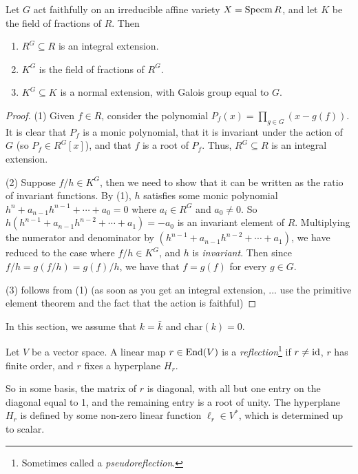 \begin{proposition}
 Let $G$ act faithfully on an irreducible affine variety $X=\operatorname{Specm} R$, and let $K$ be the field of fractions of $R$. Then
 \begin{enumerate}
  \item $R^G\subseteq R$ is an integral extension.
  \item $K^G$ is the field of fractions of $R^G$.
  \item $K^G\subseteq K$ is a normal extension, with Galois group equal to $G$.
 \end{enumerate}
\end{proposition}
\begin{proof}
 (1) Given $f\in R$, consider the polynomial $P_f(x)=\prod_{g\in G}(x-g(f))$. It is clear that $P_f$ is a monic polynomial, that it is invariant under the action of $G$ (so $P_f\in R^G[x]$), and that $f$ is a root of $P_f$. Thus, $R^G\subseteq R$ is an integral extension.
 
 (2) Suppose $f/h\in K^G$, then we need to show that it can be written as the ratio of invariant functions. By (1), $h$ satisfies some monic polynomial $h^n+a_{n-1}h^{n-1}+\cdots +a_0=0$ where $a_i\in R^G$ and $a_0\neq 0$. So $h(h^{n-1}+a_{n-1}h^{n-2}+\cdots +a_1)=-a_0$ is an invariant element of $R$. Multiplying the numerator and denominator by $(h^{n-1}+a_{n-1}h^{n-2}+\cdots +a_1)$, we have reduced to the case where $f/h\in K^G$, and $h$ is \emph{invariant}. Then since $f/h=g(f/h)=g(f)/h$, we have that $f=g(f)$ for every $g\in G$. 

 (3) follows from (1) (as soon as you get an integral extension, ... use the primitive element theorem and the fact that the action is faithful)\anton{}
\end{proof}


In this section, we assume that $k=\bar k$ and $\mathrm{char}(k)=0$.

\begin{definition}
 Let $V$ be a vector space. A linear map $r\in \operatorname{End}(V)$ is a \emph{reflection}\footnote{Sometimes called a \emph{pseudoreflection}.} if $r\neq \operatorname{id}$, $r$ has finite order, and $r$ fixes a hyperplane $H_r$.
\end{definition}
So in some basis, the matrix of $r$ is diagonal, with all but one entry on the diagonal equal to 1, and the remaining entry is a root of unity. The hyperplane $H_r$ is defined by some non-zero linear function $\ell_r\in V^*$, which is determined up to scalar.

